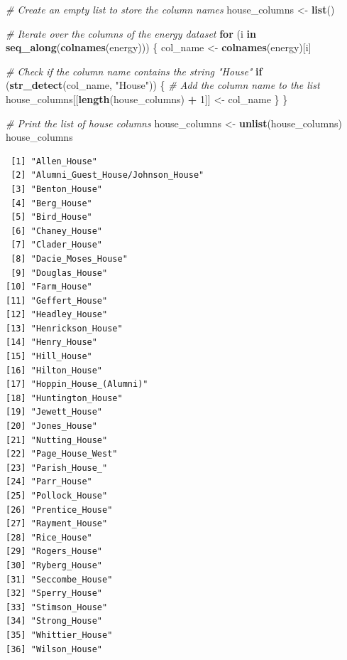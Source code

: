 \documentclass[
]{book}
\newenvironment{Shaded}{\begin{snugshade}}{\end{snugshade}}
\newcommand{\CommentTok}[1]{\textcolor[rgb]{0.56,0.35,0.01}{\textit{#1}}}
\newcommand{\ControlFlowTok}[1]{\textcolor[rgb]{0.13,0.29,0.53}{\textbf{#1}}}
\newcommand{\DecValTok}[1]{\textcolor[rgb]{0.00,0.00,0.81}{#1}}
\newcommand{\FunctionTok}[1]{\textcolor[rgb]{0.13,0.29,0.53}{\textbf{#1}}}
\newcommand{\NormalTok}[1]{#1}
\newcommand{\OtherTok}[1]{\textcolor[rgb]{0.56,0.35,0.01}{#1}}
\newcommand{\SpecialCharTok}[1]{\textcolor[rgb]{0.81,0.36,0.00}{\textbf{#1}}}
\newcommand{\StringTok}[1]{\textcolor[rgb]{0.31,0.60,0.02}{#1}}
\begin{document}
\begin{Shaded}
\begin{Highlighting}[]
\CommentTok{\# Create an empty list to store the column names}
\NormalTok{house\_columns }\OtherTok{\textless{}{-}} \FunctionTok{list}\NormalTok{()}

\CommentTok{\# Iterate over the columns of the \textquotesingle{}energy\textquotesingle{} dataset}
\ControlFlowTok{for}\NormalTok{ (i }\ControlFlowTok{in} \FunctionTok{seq\_along}\NormalTok{(}\FunctionTok{colnames}\NormalTok{(energy))) \{}
\NormalTok{  col\_name }\OtherTok{\textless{}{-}} \FunctionTok{colnames}\NormalTok{(energy)[i]}
  
  \CommentTok{\# Check if the column name contains the string "House"}
  \ControlFlowTok{if}\NormalTok{ (}\FunctionTok{str\_detect}\NormalTok{(col\_name, }\StringTok{"House"}\NormalTok{)) \{}
    \CommentTok{\# Add the column name to the list}
\NormalTok{    house\_columns[[}\FunctionTok{length}\NormalTok{(house\_columns) }\SpecialCharTok{+} \DecValTok{1}\NormalTok{]] }\OtherTok{\textless{}{-}}\NormalTok{ col\_name}
\NormalTok{  \}}
\NormalTok{\}}

\CommentTok{\# Print the list of house columns}
\NormalTok{house\_columns }\OtherTok{\textless{}{-}} \FunctionTok{unlist}\NormalTok{(house\_columns)}
\NormalTok{house\_columns}
\end{Highlighting}
\end{Shaded}

\begin{verbatim}
 [1] "Allen_House"                     
 [2] "Alumni_Guest_House/Johnson_House"
 [3] "Benton_House"                    
 [4] "Berg_House"                      
 [5] "Bird_House"                      
 [6] "Chaney_House"                    
 [7] "Clader_House"                    
 [8] "Dacie_Moses_House"               
 [9] "Douglas_House"                   
[10] "Farm_House"                      
[11] "Geffert_House"                   
[12] "Headley_House"                   
[13] "Henrickson_House"                
[14] "Henry_House"                     
[15] "Hill_House"                      
[16] "Hilton_House"                    
[17] "Hoppin_House_(Alumni)"           
[18] "Huntington_House"                
[19] "Jewett_House"                    
[20] "Jones_House"                     
[21] "Nutting_House"                   
[22] "Page_House_West"                 
[23] "Parish_House_"                   
[24] "Parr_House"                      
[25] "Pollock_House"                   
[26] "Prentice_House"                  
[27] "Rayment_House"                   
[28] "Rice_House"                      
[29] "Rogers_House"                    
[30] "Ryberg_House"                    
[31] "Seccombe_House"                  
[32] "Sperry_House"                    
[33] "Stimson_House"                   
[34] "Strong_House"                    
[35] "Whittier_House"                  
[36] "Wilson_House"                    
\end{verbatim}
\end{document}
